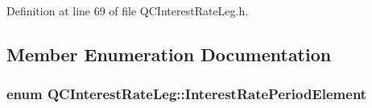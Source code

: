 Definition at line 69 of file Q\+C\+Interest\+Rate\+Leg.\+h.



\subsection{Member Enumeration Documentation}
\hypertarget{class_q_c_interest_rate_leg_aaf5f0b2b138054420ab36122c9c25b99}{
\subsubsection[{Interest\+Rate\+Period\+Element}]{\setlength{\rightskip}{0pt plus 5cm}enum {\bf Q\+C\+Interest\+Rate\+Leg\+::\+Interest\+Rate\+Period\+Element}}}\label{class_q_c_interest_rate_leg_aaf5f0b2b138054420ab36122c9c25b99}
